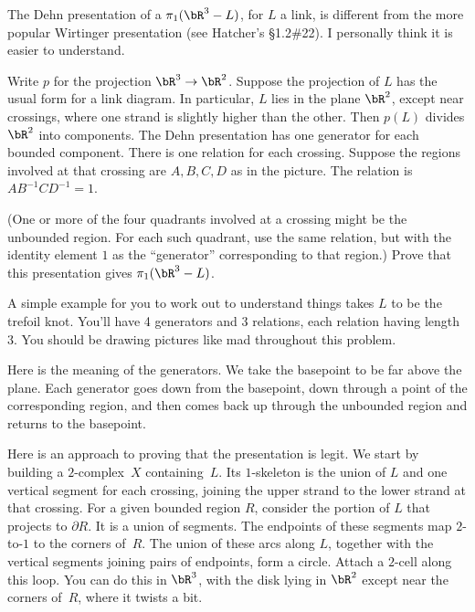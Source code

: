 \begin{homework}[e]
  \prob The Dehn presentation of a $\pi_1(\bR^3-L)$, for $L$ a link, is different
    from the more popular
    Wirtinger presentation (see Hatcher's \S1.2\#22).
    I personally think it is easier to understand.

    Write $p$ for the projection $\bR^3\to\bR^2$. Suppose the projection
    of $L$ has the usual form for a link diagram.  In particular, $L$ lies
    in the plane $\bR^2$, except near crossings, where one strand is
    slightly higher than the other.
    Then $p(L)$ divides $\bR^2$
    into components.  
    The Dehn presentation has one generator for each bounded component.
    There is one relation for each crossing.  Suppose the regions involved
    at that crossing are $A,B,C,D$ as in the picture.  The relation is
    $AB^{-1}CD^{-1}=1$.
    \begin{center}
    \end{center}
    (One or more of the four quadrants involved at a crossing might be
    the unbounded
    region. For each such quadrant, use the same relation, but with
    the identity element $1$ as the ``generator'' corresponding to that region.)
    Prove that this presentation gives $\pi_1(\bR^3-L)$.

    A simple example for you to
    work out to understand things takes $L$ to be the trefoil knot. You'll
    have 4 generators and 3 relations, each relation having length~$3$.
    You should be drawing pictures
    like mad throughout this problem.

    Here is the meaning of the generators.  We take the basepoint to
    be far above the plane. 
    Each generator goes down from the basepoint,
    down through a point of the corresponding
    region, and then comes back up through the unbounded region and returns
    to the basepoint.

    \medskip
    Here is  an approach to proving that the
    presentation is legit.  We start by building a $2$-complex~$X$ containing~$L$.
    Its $1$-skeleton is the union of $L$ and one vertical segment for each 
    crossing, joining the upper strand to the lower strand at that crossing.
    For a given bounded 
    region $R$, consider the portion of $L$ that projects to $\partial R$. 
    It is a union of segments.  The endpoints of these segments map $2$-to-$1$
    to the corners of~$R$. The union
    of these arcs along $L$, together with the vertical segments joining pairs
    of endpoints, form a circle.  Attach a $2$-cell along this loop.  You
    can do this in $\bR^3$, with the disk lying in $\bR^2$ except near the corners of~$R$, where it twists a bit.  


\end{homework}
